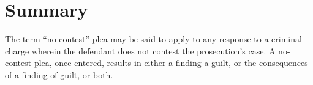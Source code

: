 \section{Summary}

The term ``no-contest” plea may be said to apply to any response to a criminal charge wherein the defendant does not contest the prosecution’s case. A no-contest plea, once entered, results in either a finding a guilt, or the consequences of a finding of guilt, or both.